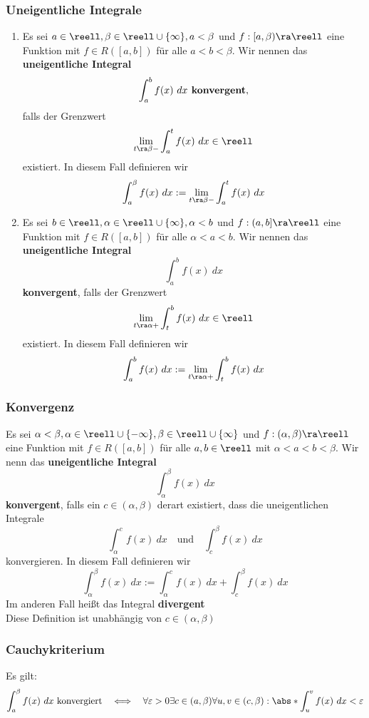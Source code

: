 \documentclass{kit}
\begin{document}
    \subsubsection{Uneigentliche Integrale}
      \begin{enumerate}
        \item Es sei $a\in\reell,\beta\in\reell\cup\{\infty\},a<\beta$ und $f:[a,\beta)\ra\reell$ eine Funktion mit $f\in R([a,b])$ für alle $a<b<\beta$. Wir nennen das \textbf{uneigentliche Integral}
          $$\int^b_af(x)\ dx\text{\textbf{ konvergent}},$$
          falls der Grenzwert
          $$\lim_{t\ra\beta-}\int^t_af(x)\ dx\in\reell$$
          existiert. In diesem Fall definieren wir
          $$\int^\beta_af(x)\ dx:=\lim_{t\ra\beta-}\int^t_af(x)\ dx$$
        \item Es sei $b\in\reell,\alpha\in\reell\cup\{\infty\},\alpha<b$ und $f:(a,b]\ra\reell$ eine Funktion mit $f\in R([a,b])$ für alle $\alpha<a<b$. Wir nennen das \textbf{uneigentliche Integral}
          $$\int^b_af(x)\ dx$$
          \textbf{ konvergent}, falls der Grenzwert
          $$\lim_{t\ra\alpha+}\int^b_tf(x)\ dx\in\reell$$
          existiert. In diesem Fall definieren wir
          $$\int^b_af(x)\ dx:=\lim_{t\ra\alpha+}\int^b_tf(x)\ dx$$
      \end{enumerate}
    \subsubsection{Konvergenz}
      Es sei $\alpha<\beta,\alpha\in\reell\cup\{-\infty\},\beta\in\reell\cup\{\infty\}$ und $f:(\alpha,\beta)\ra\reell$ eine Funktion mit $f\in R([a,b])$ für alle $a,b\in\reell$ mit $\alpha<a<b<\beta$. Wir nenn das \textbf{uneigentliche Integral}
      $$\int^\beta_\alpha f(x)\ dx$$
      \textbf{ konvergent}, falls ein $c\in(\alpha,\beta)$ derart existiert, dass die uneigentlichen Integrale
      $$\int^c_\alpha f(x)\ dx\quad\text{und}\quad\int^\beta_cf(x)\ dx$$
      konvergieren. In diesem Fall definieren wir
      $$\int^\beta_\alpha f(x)\ dx:=\int^c_\alpha f(x)\ dx+\int^\beta_cf(x)\ dx$$
      Im anderen Fall heißt das Integral \textbf{divergent}\\
      Diese Definition ist unabhängig von $c\in(\alpha,\beta)$
    \subsubsection{Cauchykriterium}
      Es gilt:
      $$\int^\beta_af(x)\ dx\text{ konvergiert}\quad\Longleftrightarrow\quad\forall\varepsilon>0\exists c\in(a,\beta)\forall u,v\in(c,\beta):\abs*{\int^v_uf(x)\ dx}<\varepsilon$$
\end{document}
